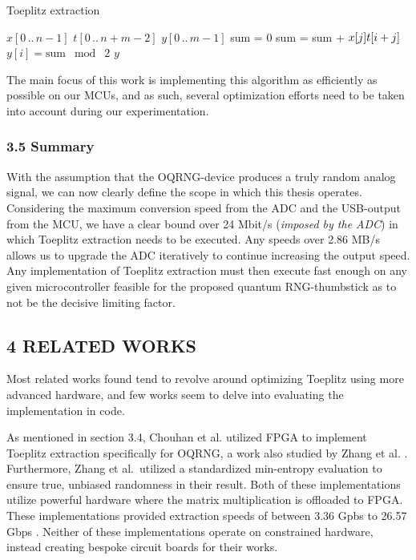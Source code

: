 \begin{algorithm}[ht] \caption{Toeplitz extraction}\label{alg:bit-conv}
\begin{algorithmic}[1] \REQUIRE \(x[0\,..\,n-1]\)  \REQUIRE \(t[0\,..\,n+m-2]\)  \ENSURE \(y[0\,..\,m-1]\) 
 \STATE sum = 0  \STATE
sum = sum + \(x[j] \* t[i + j]\) \ENDFOR \STATE \(y[i] =
\mathrm{sum}\;\bmod\;2\) \ENDFOR \RETURN \(y\) \end{algorithmic} \end{algorithm}

The main focus of this work is implementing this algorithm as efficiently as possible on our MCUs, and as such, several optimization efforts need to be taken into account during our experimentation.

\subsubsection{3.5 Summary}\label{summary}

With the assumption that the OQRNG-device produces a truly random analog signal, we can now clearly define the scope in which this thesis operates. Considering the maximum conversion speed from the ADC and the USB-output from the MCU, we have a clear bound over 24 Mbit/s (\emph{imposed by the ADC}) in which Toeplitz extraction needs to be executed. Any speeds over 2.86 MB/s allows us to upgrade the ADC iteratively to continue increasing the output speed. Any implementation of Toeplitz extraction must then execute fast enough on any given microcontroller feasible for the proposed quantum RNG-thumbstick as to not be the decisive limiting factor.

\subsection{4 RELATED WORKS}\label{related-works}

Most related works found tend to revolve around optimizing Toeplitz using more advanced hardware, and few works seem to delve into evaluating the implementation in code.

As mentioned in section 3.4, Chouhan et al. \cite{toeplitz-desc} utilized FPGA to implement Toeplitz extraction specifically for OQRNG, a work also studied by Zhang et al. \cite{toeplitz}. Furthermore, Zhang et al.~utilized a standardized min-entropy evaluation to ensure true, unbiased randomness in their result. Both of these implementations utilize powerful hardware where the matrix multiplication is offloaded to FPGA. These implementations provided extraction speeds of between 3.36 Gpbs \cite{toeplitz} to 26.57 Gbps \cite{toeplitz-desc}. Neither of these implementations operate on constrained hardware, instead creating bespoke circuit boards for their works.

